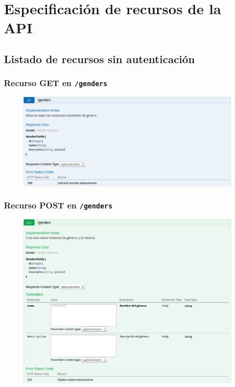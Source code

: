 \section{Especificación de recursos de la API}
\label{apendice_especificacion_api}
\subsection{Listado de recursos sin autenticación}

\subsubsection{Recurso GET en \texttt{/genders}}

\begin{figure}[h]
  \centering
  \includegraphics[width=\textwidth,height=.75\textheight,keepaspectratio]{img/especificacion_api/genderList_get}
  \label{genderList_get}
\end{figure}

\newpage


\subsubsection{Recurso POST en \texttt{/genders}}

\begin{figure}[h]
  \centering
  \includegraphics[width=\textwidth,height=.75\textheight,keepaspectratio]{img/especificacion_api/genderList_post}
  \label{genderList_post}
\end{figure}

